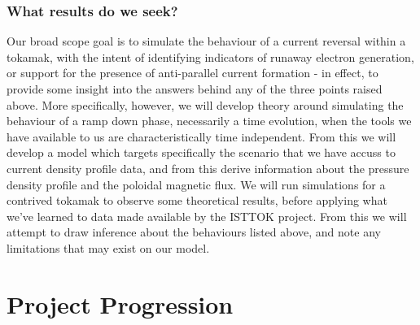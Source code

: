 \subsubsection{What results do we seek?}
Our broad scope goal is to simulate the behaviour of a current reversal within a tokamak, with the intent 
of identifying indicators of runaway electron generation, or support for the presence of anti-parallel current formation
- in effect, to provide some insight into the answers behind any of the three points raised above. 
More specifically, however, we will develop theory around simulating the behaviour of a ramp down phase, necessarily a time evolution, when 
the tools we have available to us are characteristically time independent. From this we will develop a model 
which targets specifically the scenario that we have accuss to current density profile data, and from this 
derive information about the pressure density profile and the poloidal magnetic flux. We will run simulations 
for a contrived tokamak to observe some theoretical results, before applying what we've learned to data 
made available by the ISTTOK project. From this we will attempt to draw inference about the behaviours listed 
above, and note any limitations that may exist on our model.

\section{Project Progression}


